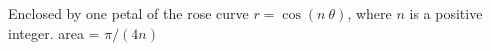 {Enclosed by one petal of the rose curve $r=\cos (n\ \theta)$, where $n$ is a positive integer.
}
{area = $\pi/(4n)$
}
